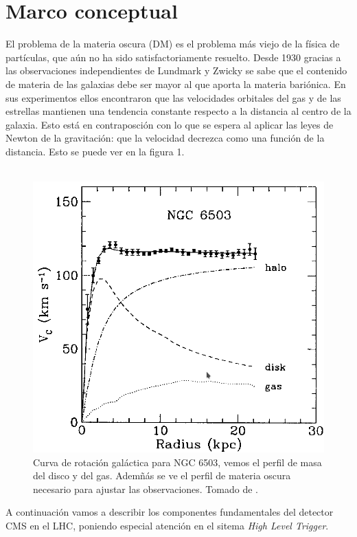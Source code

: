 \section{Marco conceptual}
El problema de la materia oscura (DM) es el problema más viejo de la física de partículas, que aún no ha sido satisfactoriamente resuelto. Desde 1930 gracias a las observaciones independientes de Lundmark y Zwicky \cite{ARTICLE:1,ARTICLE:2} se sabe que el contenido de materia de las galaxias debe ser mayor al que aporta la materia bariónica. En sus experimentos ellos encontraron que las velocidades orbitales del gas y de las estrellas mantienen una tendencia constante respecto a la distancia al centro de la galaxia.
 Esto está en contraposción con lo que se espera al aplicar las leyes de Newton de la gravitación: que la velocidad decrezca como una función de la distancia. Esto se puede ver en la figura 1.
\\
\\
\begin{figure}
\centering
\includegraphics[width=12cm]{F1.png}
\caption{\label{fig:frog} Curva de rotación galáctica para NGC 6503, vemos el perfil de masa del disco y del gas. Ademñás se ve el perfil de materia oscura necesario para ajustar las observaciones. Tomado de \cite{Freese:2017idy}.}
\end{figure}
A continuación vamos a describir los componentes fundamentales del detector CMS en el LHC, poniendo especial atención en el sitema \textit{High Level Trigger}.


